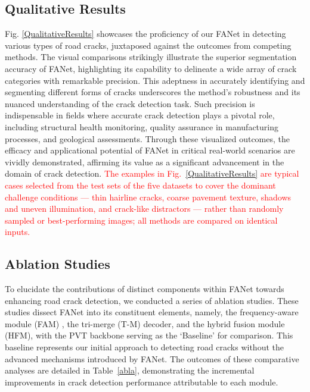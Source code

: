 \documentclass[journal]{IEEEtran}
\begin{document}
\subsection{Qualitative Results} \label{sec:Qualitative-Results}
Fig. \ref{QualitativeResults} showcases the proficiency of our FANet in detecting various types of road cracks, juxtaposed against the outcomes from competing methods. The visual comparisons strikingly illustrate the superior segmentation accuracy of FANet, highlighting its capability to delineate a wide array of crack categories with remarkable precision. This adeptness in accurately identifying and segmenting different forms of cracks underscores the method's robustness and its nuanced understanding of the crack detection task. Such precision is indispensable in fields where accurate crack detection plays a pivotal role, including structural health monitoring, quality assurance in manufacturing processes, and geological assessments. Through these visualized outcomes, the efficacy and applicational potential of FANet in critical real-world scenarios are vividly demonstrated, affirming its value as a significant advancement in the domain of crack detection.
\textcolor{red}{The examples in Fig.~\ref{QualitativeResults} are typical cases selected from the test sets of the five datasets to cover the dominant challenge conditions --- thin hairline cracks, coarse pavement texture, shadows and uneven illumination, and crack-like distractors --- rather than randomly sampled or best-performing images; all methods are compared on identical inputs.}


\subsection{Ablation Studies}
To elucidate the contributions of distinct components within FANet towards enhancing road crack detection, we conducted a series of ablation studies. These studies dissect FANet into its constituent elements, namely, the frequency-aware module (FAM) , the tri-merge (T-M) decoder, and the hybrid fusion module (HFM), with the PVT backbone serving as the `Baseline’ for comparison. This baseline represents our initial approach to detecting road cracks without the advanced mechanisms introduced by FANet. 
%
The outcomes of these comparative analyses are detailed in Table~\ref{abla}, demonstrating the incremental improvements in crack detection performance attributable to each module.
\end{document}
